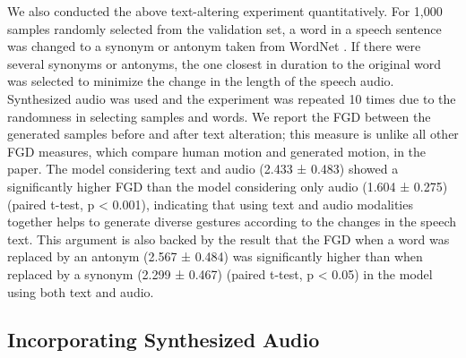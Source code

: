 \documentclass[acmtog]{acmart}
\begin{document}
We also conducted the above text-altering experiment quantitatively. For 1,000 samples randomly selected from the validation set, a word in a speech sentence was changed to a synonym or antonym taken from WordNet \cite{miller1995wordnet}. If there were several synonyms or antonyms, the one closest in duration to the original word was selected to minimize the change in the length of the speech audio. Synthesized audio was used and the experiment was repeated 10 times due to the randomness in selecting samples and words. We report the FGD between the generated samples before and after text alteration; this measure is unlike all other FGD measures, which compare human motion and generated motion, in the paper. The model considering text and audio (2.433 ± 0.483) showed a significantly higher FGD than the model considering only audio (1.604 ± 0.275) (paired t-test, p < 0.001), indicating that using text and audio modalities together helps to generate diverse gestures according to the changes in the speech text. This argument is also backed by the result that the FGD when a word was replaced by an antonym (2.567 ± 0.484) was significantly higher than when replaced by a synonym (2.299 ± 0.467) (paired t-test, p < 0.05) in the model using both text and audio.

\subsection{Incorporating Synthesized Audio}
\end{document}
